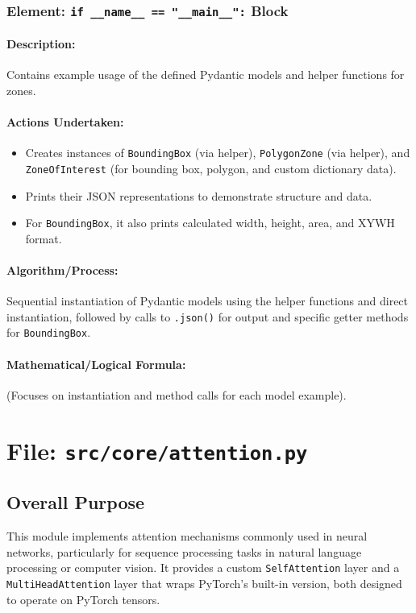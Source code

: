 \documentclass{article}
\begin{document}
\subsubsection{Element: \texttt{if \_\_name\_\_ == "\_\_main\_\_":} Block}
\paragraph{Description:} Contains example usage of the defined Pydantic models and helper functions for zones.
\paragraph{Actions Undertaken:}
\begin{itemize}
    \item Creates instances of \texttt{BoundingBox} (via helper), \texttt{PolygonZone} (via helper), and \texttt{ZoneOfInterest} (for bounding box, polygon, and custom dictionary data).
    \item Prints their JSON representations to demonstrate structure and data.
    \item For \texttt{BoundingBox}, it also prints calculated width, height, area, and XYWH format.
\end{itemize}
\paragraph{Algorithm/Process:} Sequential instantiation of Pydantic models using the helper functions and direct instantiation, followed by calls to \texttt{.json()} for output and specific getter methods for \texttt{BoundingBox}.
\paragraph{Mathematical/Logical Formula:} (Focuses on instantiation and method calls for each model example).

\newpage
\section{File: \texttt{src/core/attention.py}}
\subsection{Overall Purpose}
This module implements attention mechanisms commonly used in neural networks, particularly for sequence processing tasks in natural language processing or computer vision. It provides a custom \texttt{SelfAttention} layer and a \texttt{MultiHeadAttention} layer that wraps PyTorch's built-in version, both designed to operate on PyTorch tensors.
\end{document}
